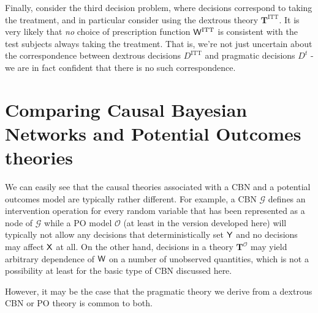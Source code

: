 Finally, consider the third decision problem, where decisions correspond to taking the treatment, and in particular consider using the dextrous theory $\mathbf{T}^{\mathrm{ITT}}$. It is very likely that \emph{no} choice of prescription function $\mathsf{W}^{\mathrm{ITT}}$ is consistent with the test subjects always taking the treatment. That is, we're not just uncertain about the correspondence between dextrous decisions $D^{\mathrm{ITT}}$ and pragmatic decisions $D^t$ - we are in fact confident that there is no such correspondence.

\section{Comparing Causal Bayesian Networks and Potential Outcomes theories}

We can easily see that the causal theories associated with a CBN and a potential outcomes model are typically rather different. For example, a CBN $\mathcal{G}$ defines an intervention operation for every random variable that has been represented as a node of $\mathcal{G}$ while a PO model $\mathscr{O}$ (at least in the version developed here) will typically not allow any decisions that deterministically set $\mathsf{Y}$ and no decisions may affect $\mathsf{X}$ at all. On the other hand, decisions in a theory $\mathbf{T}^{\mathscr{O}}$ may yield arbitrary dependence of $\mathsf{W}$ on a number of unobserved quantities, which is not a possibility at least for the basic type of CBN discussed here.

However, it may be the case that the pragmatic theory we derive from a dextrous CBN or PO theory is common to both.

